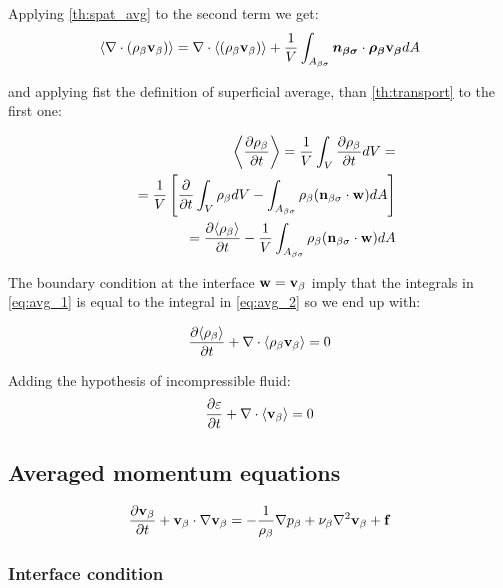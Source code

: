 Applying \ref{th:spat_avg} to the second term we get:
\begin{equation}
 {\left< \nabla \cdot (\rho_{\beta}\textbf{v}_{\beta}) \right>} = \nabla \cdot {\left<  (\rho_{\beta}\textbf{v}_{\beta}) \right>} + \dfrac{1}{V} \int_{A_{\beta \sigma}} \boldsymbol{n_{\beta \sigma}} \cdot \boldsymbol{\rho_{\beta} \textbf{v}_{\beta}} dA
 \label{eq:avg_1}
\end{equation}

and applying fist the definition of superficial average, than \ref{th:transport} to the first one:

\begin{eqnarray}
&&{\left< \dfrac{\partial \rho_{\beta}}{\partial t} \right>} = \dfrac{1}{V} \int_{V} \dfrac{\partial \rho_{\beta}}{\partial t} dV = \\
&& = \dfrac{1}{V} \left[  \dfrac{\partial}{\partial t} \int_{V} \rho_{\beta} dV -  \int_{A_{\beta \sigma}} \rho_{\beta} (\mathbf{n}_{\beta \sigma} \cdot \mathbf{w} ) dA   \right] \\
&& = \dfrac{\partial {\left< \rho_{\beta} \right>}}{\partial t} -\dfrac{1}{V}  \int_{A_{\beta \sigma}} \rho_{\beta} (\mathbf{n}_{\beta \sigma} \cdot \mathbf{w} ) dA 
\label{eq:avg_2}
\end{eqnarray}

The boundary condition at the interface $\mathbf{w} = \textbf{v}_{\beta}$ imply that the integrals in \ref{eq:avg_1} is equal to the integral in \ref{eq:avg_2} so we end up with:

\begin{equation}
\frac{\partial {\left< \rho_{\beta} \right>}}{\partial t} + \nabla \cdot {\left< \rho_{\beta}\textbf{v}_{\beta}\right>} = 0
\end{equation}

Adding the hypothesis of incompressible fluid:
\begin{equation}
\frac{\partial \varepsilon}{\partial t} + \nabla \cdot {\left< \textbf{v}_{\beta}\right>} = 0
\end{equation}



\subsection{Averaged momentum equations}


\begin{equation}
\dfrac{\partial \textbf{v}_{\beta}}{\partial t} + \textbf{v}_{\beta} \cdot \nabla \textbf{v}_{\beta} = -\frac{1}{\rho_{\beta}} \nabla p_{\beta} + \nu_{\beta} \nabla^2  \textbf{v}_{\beta}  + \mathbf{f}
\label{eq:mom_vans}
\end{equation}



\subsubsection{Interface condition}

